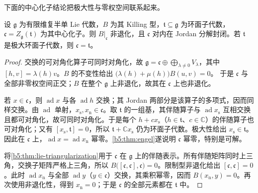 \ProseParagraphBreak

下面的中心化子结论把极大性与零权空间联系起来。

\begin{lemma}\label{b5:lem:toral-centralizer}
	设 \(\mathfrak g\) 为有限维复半单 Lie 代数，\(B\) 为其 Killing 型，\(\mathfrak t\subseteq\mathfrak g\) 为环面子代数，\(\mathfrak c=Z_{\mathfrak g}(\mathfrak t)\) 为其中心化子。则 \(B|_{\mathfrak c}\) 非退化，且 \(\mathfrak c\) 对内在 Jordan 分解封闭。若 \(\mathfrak t\) 是极大环面子代数，则 \(\mathfrak c=\mathfrak t\)。
\end{lemma}
\begin{proof}
	交换的可对角化算子可同时对角化，故 \(\mathfrak g=\mathfrak c\oplus\bigoplus_{\lambda\ne0}V_\lambda\)，其中 \([h,v]=\lambda(h)v\)。\(B\) 的不变性给出 \(\bigl(\lambda(h)+\mu(h)\bigr)B(u,v)=0\)。 于是 \(\mathfrak c\) 与全部非零权空间正交；\(B\) 在整个 \(\mathfrak g\) 上非退化，故其在 \(\mathfrak c\) 上也非退化。

	若 \(x\in\mathfrak c\)，则 \(\operatorname{ad}x\) 与各 \(\operatorname{ad}h\) 交换；其 Jordan 两部分是该算子的多项式，因而同样交换。由 \(\operatorname{ad}\) 单射，\(x_{\mathrm s},x_{\mathrm n}\in\mathfrak c\)。取 \(\mathfrak t\) 的一组基，其伴随算子与 \(\operatorname{ad}x_{\mathrm s}\) 互相交换且都可对角化，故可同时对角化。于是每个 \(h+cx_{\mathrm s}\)（\(h\in\mathfrak t\)、\(c\in\mathbb C\)）的伴随算子也可对角化；又有 \([x_{\mathrm s},\mathfrak t]=0\)，所以 \(\mathfrak t+\mathbb Cx_{\mathrm s}\) 仍为环面子代数。极大性给出 \(x_{\mathrm s}\in\mathfrak t\)。因此在 \(\mathfrak c\) 上，\(\operatorname{ad}x=\operatorname{ad}x_{\mathrm n}\) 幂零。\cref{b5:thm:engel}遂说明 \(\mathfrak c\) 幂零，特别是可解。

	将\cref{b5:thm:lie-triangularization}用于 \(\mathfrak c\) 在 \(\mathfrak g\) 上的伴随表示。所有伴随矩阵同时上三角，交换子矩阵严格上三角，所以 \(B\bigl([\mathfrak c,\mathfrak c],\mathfrak c\bigr)=0\)。限制型非退化给出 \([\mathfrak c,\mathfrak c]=0\)。此时 \(\operatorname{ad}x_{\mathrm n}\) 与全部 \(\operatorname{ad}y\)（\(y\in\mathfrak c\)）交换，其乘积幂零，因而 \(B(x_{\mathrm n},y)=0\)。再次使用非退化性，得到 \(x_{\mathrm n}=0\)；于是 \(\mathfrak c\) 的全部元素都在 \(\mathfrak t\) 中。
\end{proof}

